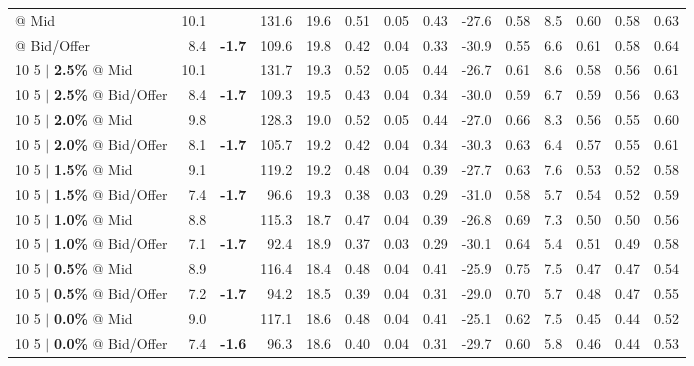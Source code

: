 \documentclass{beamer}
\begin{document}
\begin{frame}
\begin{table}
{\begin{tabular}{lrcrrrrrrrrrrr}
\addlinespace
\color{blue}{10 5 $|$ \bf 3.0\%} @ Mid & 10.1 & & 131.6 & 19.6 & 0.51 & 0.05 & 0.43 & -27.6 & 0.58 & 8.5 & 0.60 & 0.58 & 0.63\\
\color{blue}{10 5 $|$ \bf 3.0\%} @ Bid/Offer & 8.4 & {\bf \color{red}-1.7} & 109.6 & 19.8 & 0.42 & 0.04 & 0.33 & -30.9 & 0.55 & 6.6 & 0.61 & 0.58 & 0.64\\
\addlinespace
{10 5 $|$ \bf 2.5\%} @ Mid & 10.1 & & 131.7 & 19.3 & 0.52 & 0.05 & 0.44 & -26.7 & 0.61 & 8.6 & 0.58 & 0.56 & 0.61\\
{10 5 $|$ \bf 2.5\%} @ Bid/Offer & 8.4 & {\bf \color{red}-1.7} & 109.3 & 19.5 & 0.43 & 0.04 & 0.34 & -30.0 & 0.59 & 6.7 & 0.59 & 0.56 & 0.63\\
\addlinespace
{10 5 $|$ \bf 2.0\%} @ Mid & 9.8 & & 128.3 & 19.0 & 0.52 & 0.05 & 0.44 & -27.0 & 0.66 & 8.3 & 0.56 & 0.55 & 0.60\\
{10 5 $|$ \bf 2.0\%} @ Bid/Offer & 8.1 & {\bf \color{red}-1.7} & 105.7 & 19.2 & 0.42 & 0.04 & 0.34 & -30.3 & 0.63 & 6.4 & 0.57 & 0.55 & 0.61\\
\addlinespace
{10 5 $|$ \bf 1.5\%} @ Mid & 9.1 & & 119.2 & 19.2 & 0.48 & 0.04 & 0.39 & -27.7 & 0.63 & 7.6 & 0.53 & 0.52 & 0.58\\
{10 5 $|$ \bf 1.5\%} @ Bid/Offer & 7.4 & {\bf \color{red}-1.7} & 96.6 & 19.3 & 0.38 & 0.03 & 0.29 & -31.0 & 0.58 & 5.7 & 0.54 & 0.52 & 0.59\\
\addlinespace
{10 5 $|$ \bf 1.0\%} @ Mid & 8.8 & & 115.3 & 18.7 & 0.47 & 0.04 & 0.39 & -26.8 & 0.69 & 7.3 & 0.50 & 0.50 & 0.56\\
{10 5 $|$ \bf 1.0\%} @ Bid/Offer & 7.1 & {\bf \color{red}-1.7} & 92.4 & 18.9 & 0.37 & 0.03 & 0.29 & -30.1 & 0.64 & 5.4 & 0.51 & 0.49 & 0.58\\
\addlinespace
{10 5 $|$ \bf 0.5\%} @ Mid & 8.9 & & 116.4 & 18.4 & 0.48 & 0.04 & 0.41 & -25.9 & 0.75 & 7.5 & 0.47 & 0.47 & 0.54\\
{10 5 $|$ \bf 0.5\%} @ Bid/Offer & 7.2 & {\bf \color{red}-1.7} & 94.2 & 18.5 & 0.39 & 0.04 & 0.31 & -29.0 & 0.70 & 5.7 & 0.48 & 0.47 & 0.55\\
\addlinespace
{10 5 $|$ \bf 0.0\%} @ Mid & 9.0 & & 117.1 & 18.6 & 0.48 & 0.04 & 0.41 & -25.1 & 0.62 & 7.5 & 0.45 & 0.44 & 0.52\\
{10 5 $|$ \bf 0.0\%} @ Bid/Offer & 7.4 & {\bf \color{red}-1.6} & 96.3 & 18.6 & 0.40 & 0.04 & 0.31 & -29.7 & 0.60 & 5.8 & 0.46 & 0.44 & 0.53\\
\bottomrule
\end{tabular}
}
\end{table}
\end{frame}
\end{document}
